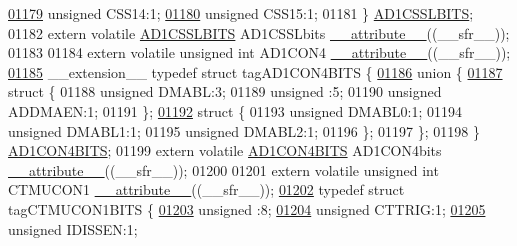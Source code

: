 \begin{DoxyCode}
\hypertarget{a00015_source_l01179}{}\hyperlink{a00014_a89250af994a2b9a7759f36e15b8c41b8}{01179}   \textcolor{keywordtype}{unsigned} CSS14:1;
\hypertarget{a00015_source_l01180}{}\hyperlink{a00014_adde564d938af376e76a2d400e47ba78e}{01180}   \textcolor{keywordtype}{unsigned} CSS15:1;
01181 \} \hyperlink{a00014_d9/df8/a00096}{AD1CSSLBITS};
01182 \textcolor{keyword}{extern} \textcolor{keyword}{volatile} \hyperlink{a00014_d9/df8/a00096}{AD1CSSLBITS} AD1CSSLbits \hyperlink{a00015_a493c46f03454991ccc5aa7a6e1dfb2a7}{\_\_attribute\_\_}((\_\_sfr\_\_));
01183 
01184 \textcolor{keyword}{extern} \textcolor{keyword}{volatile} \textcolor{keywordtype}{unsigned} \textcolor{keywordtype}{int}  AD1CON4 \hyperlink{a00015_a493c46f03454991ccc5aa7a6e1dfb2a7}{\_\_attribute\_\_}((\_\_sfr\_\_));
\hypertarget{a00015_source_l01185}{}\hyperlink{a00014}{01185} \_\_extension\_\_ \textcolor{keyword}{typedef} \textcolor{keyword}{struct }tagAD1CON4BITS \{
\hypertarget{a00015_source_l01186}{}\hyperlink{a00015}{01186}   \textcolor{keyword}{union }\{
\hypertarget{a00015_source_l01187}{}\hyperlink{a00015}{01187}     \textcolor{keyword}{struct }\{
01188       \textcolor{keywordtype}{unsigned} DMABL:3;
01189       \textcolor{keywordtype}{unsigned} :5;
01190       \textcolor{keywordtype}{unsigned} ADDMAEN:1;
01191     \};
\hypertarget{a00015_source_l01192}{}\hyperlink{a00015}{01192}     \textcolor{keyword}{struct }\{
01193       \textcolor{keywordtype}{unsigned} DMABL0:1;
01194       \textcolor{keywordtype}{unsigned} DMABL1:1;
01195       \textcolor{keywordtype}{unsigned} DMABL2:1;
01196     \};
01197   \};
01198 \} \hyperlink{a00014_d1/dc1/a00092}{AD1CON4BITS};
01199 \textcolor{keyword}{extern} \textcolor{keyword}{volatile} \hyperlink{a00014_d1/dc1/a00092}{AD1CON4BITS} AD1CON4bits \hyperlink{a00015_a493c46f03454991ccc5aa7a6e1dfb2a7}{\_\_attribute\_\_}((\_\_sfr\_\_));
01200 
01201 \textcolor{keyword}{extern} \textcolor{keyword}{volatile} \textcolor{keywordtype}{unsigned} \textcolor{keywordtype}{int}  CTMUCON1 \hyperlink{a00015_a493c46f03454991ccc5aa7a6e1dfb2a7}{\_\_attribute\_\_}((\_\_sfr\_\_));
\hypertarget{a00015_source_l01202}{}\hyperlink{a00014}{01202} \textcolor{keyword}{typedef} \textcolor{keyword}{struct }tagCTMUCON1BITS \{
\hypertarget{a00015_source_l01203}{}\hyperlink{a00014_adf71f3d8410c1f1dbbc96680a92c49af}{01203}   \textcolor{keywordtype}{unsigned} :8;
\hypertarget{a00015_source_l01204}{}\hyperlink{a00014_a7b5bdaef4207a8c492c613dbd8d4c242}{01204}   \textcolor{keywordtype}{unsigned} CTTRIG:1;
\hypertarget{a00015_source_l01205}{}\hyperlink{a00014_a156749521a1fd62d08b18d5ee39e54b9}{01205}   \textcolor{keywordtype}{unsigned} IDISSEN:1;

\end{DoxyCode}

